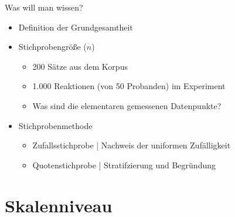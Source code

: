 \begin{frame}
  {Was will man wissen?}
  \begin{itemize}[<+->]
    \item Definition der Grundgesamtheit
      \Halbzeile
    \item \alert{Stichprobengröße ($n$)}
      \begin{itemize}[<+->]
        \item 200 Sätze aus dem Korpus
        \item 1.000 Reaktionen (von 50 Probanden) im Experiment
        \item Was sind die elementaren gemessenen Datenpunkte?
      \end{itemize}
      \Halbzeile
    \item Stichprobenmethode
      \begin{itemize}[<+->]
        \item \alert{Zufallsstichprobe} | Nachweis der uniformen Zufälligkeit
        \item \alert{Quotenstichprobe} | Stratifzierung und Begründung
      \end{itemize}
  \end{itemize}
\end{frame}


\section{Skalenniveau}

